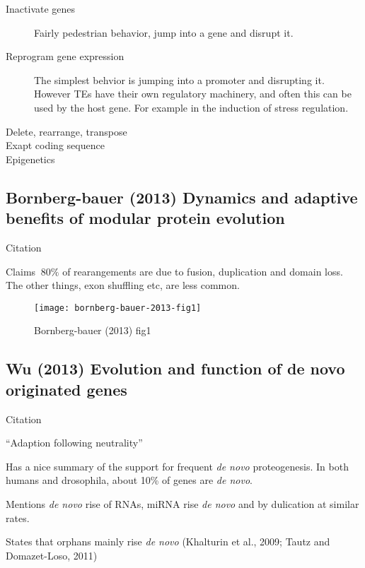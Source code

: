     \begin{description}
        \item[Inactivate genes] Fairly pedestrian behavior, jump into a gene and disrupt it.
        \item[Reprogram gene expression] The simplest behvior is jumping into a
            promoter and disrupting it. However TEs have their own regulatory
            machinery, and often this can be used by the host gene. For example
            in the induction of stress regulation.
        \item[Delete, rearrange, transpose] 
        \item[Exapt coding sequence]
        \item[Epigenetics]
    \end{description}

\subsection{Bornberg-bauer (2013) Dynamics and adaptive benefits of modular
protein evolution}

    Citation \cite{bornberg-bauer_dynamics_2013}

    Claims $~80\%$ of rearangements are due to fusion, duplication and domain
    loss. The other things, exon shuffling etc, are less common.

    \begin{figure}[!hbpt]
        \centering
        \texttt{[image: bornberg-bauer-2013-fig1]}
        \caption{Bornberg-bauer (2013) fig1}
    \end{figure}
    \FloatBarrier

\subsection{Wu (2013) Evolution and function of de novo
originated genes}

    Citation \cite{wu_evolution_2013}

    ``Adaption following neutrality''

    Has a nice summary of the support for frequent \textit{de novo}
    proteogenesis. In both humans and drosophila, about 10\% of genes are
    \textit{de novo}.

    Mentions \textit{de novo} rise of RNAs, miRNA rise \textit{de novo} and
    by dulication at similar rates.

    States that orphans mainly rise \textit{de novo} (Khalturin et al.,
    2009; Tautz and Domazet-Loso, 2011)

